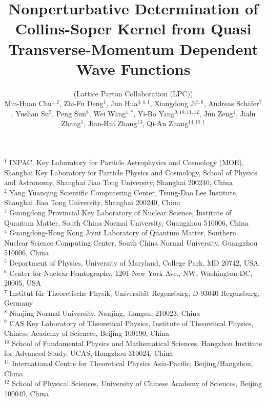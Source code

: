 \documentclass[11pt]{article}
\begin{document}
\title{Nonperturbative Determination of Collins-Soper Kernel from
Quasi Transverse-Momentum Dependent Wave Functions}
\author{%
(Lattice Parton Collaboration (LPC))\\[1mm]
Min-Huan Chu$^{1,2}$,
Zhi-Fu Deng$^{1}$,
Jun Hua$^{3,4,1}$,
Xiangdong Ji$^{5,6}$,
Andreas Sch\"afer$^{7}$,
Yushan Su$^{5}$,
Peng Sun$^{8}$,
Wei Wang$^{1,\ast}$,
Yi-Bo Yang$^{9,10,11,12}$,
Jun Zeng$^{1}$,
Jialu Zhang$^{1}$,
Jian-Hui Zhang$^{13}$,
Qi-An Zhang$^{14,15,\dagger}$%
}
\date{}
\maketitle

{\small
\baselineskip 11pt
\noindent
$^1$ INPAC, Key Laboratory for Particle Astrophysics and Cosmology (MOE),
Shanghai Key Laboratory for Particle Physics and Cosmology,
School of Physics and Astronomy, Shanghai Jiao Tong University, Shanghai 200240, China\\
$^2$ Yang Yuanqing Scientific Computering Center, Tsung-Dao Lee Institute,
Shanghai Jiao Tong University, Shanghai 200240, China\\
$^3$ Guangdong Provincial Key Laboratory of Nuclear Science, Institute of Quantum Matter,
South China Normal University, Guangzhou 510006, China\\
$^4$ Guangdong-Hong Kong Joint Laboratory of Quantum Matter, Southern Nuclear Science Computing Center,
South China Normal University, Guangzhou 510006, China\\
$^5$ Department of Physics, University of Maryland, College Park, MD 20742, USA\\
$^6$ Center for Nuclear Femtography, 1201 New York Ave., NW, Washington DC, 20005, USA\\
$^7$ Institut f\"ur Theoretische Physik, Universit\"at Regensburg, D-93040 Regensburg, Germany\\
$^8$ Nanjing Normal University, Nanjing, Jiangsu, 210023, China\\
$^9$ CAS Key Laboratory of Theoretical Physics, Institute of Theoretical Physics,
Chinese Academy of Sciences, Beijing 100190, China\\
$^{10}$ School of Fundamental Physics and Mathematical Sciences, Hangzhou Institute for Advanced Study,
UCAS, Hangzhou 310024, China\\
$^{11}$ International Centre for Theoretical Physics Asia-Pacific, Beijing/Hangzhou, China\\
$^{12}$ School of Physical Sciences, University of Chinese Academy of Sciences, Beijing 100049, China\\
}
\end{document}
